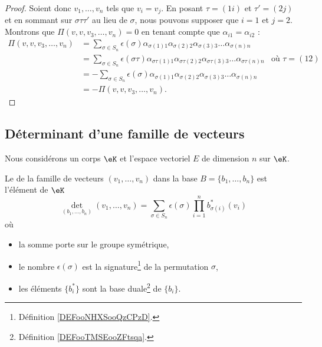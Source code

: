 \begin{proof}
	Soient donc \( v_1,\ldots, v_n\) tels que \( v_i=v_j\). En posant \( \tau=(1i)\) et \( \tau'=(2j)\) et en sommant sur \( \sigma\tau\tau'\) au lieu de \( \sigma\), nous pouvons supposer que \( i=1\) et \( j=2\). Montrons que \( \Pi(v,v,v_3,\ldots, v_n)=0\) en tenant compte que \( \alpha_{i1}=\alpha_{i2}\) :
	\begin{subequations}
		\begin{align}
			\Pi(v,v,v_3,\ldots, v_n) & =\sum_{\sigma\in S_n}\epsilon(\sigma)\alpha_{\sigma(1)1}\alpha_{\sigma(2)2}\alpha_{\sigma(3)3}\ldots \alpha_{\sigma(n)n}                                            \\
			                         & =\sum_{\sigma\in S_n}\epsilon(\sigma\tau)\alpha_{\sigma\tau(1)1}\alpha_{\sigma\tau(2)2}\alpha_{\sigma\tau(3)3}\ldots \alpha_{\sigma\tau(n)n} & \text{où } \tau=(12) \\
			                         & =-\sum_{\sigma\in S_n}\epsilon(\sigma)\alpha_{\sigma(1)1}\alpha_{\sigma(2)2}\alpha_{\sigma(3)3}\ldots \alpha_{\sigma(n)n}                                           \\
			                         & =-\Pi(v,v,v_3,\ldots, v_n).
		\end{align}
	\end{subequations}
\end{proof}

\subsection{Déterminant d'une famille de vecteurs}

Nous considérons un corps \( \eK\) et l'espace vectoriel \( E\) de dimension \( n\) sur \( \eK\).

\begin{definition}\label{DEFooODDFooSNahPb}
	Le  de la famille de vecteurs \( (v_1,\ldots, v_n)\) dans la base \( B=\{ b_1,\ldots, b_n \}\) est l'élément de \( \eK\)
	\begin{equation}        \label{EQooOJEXooXUpwfZ}
		\det_{(b_1,\ldots, b_n)}(v_1,\ldots, v_n)=\sum_{\sigma\in S_n}\epsilon(\sigma)\prod_{i=1}^nb^*_{\sigma(i)}(v_i)
	\end{equation}
	où
	\begin{itemize}
		\item
		      la somme porte sur le groupe symétrique,
		\item
		      le nombre \( \epsilon(\sigma)\) est la signature\footnote{Définition \ref{DEFooNHXSooQzCPzD}.} de la permutation \( \sigma\),
		\item
		      les éléments \( \{ b^*_i \}\) sont la base duale\footnote{Définition \ref{DEFooTMSEooZFtsqa}.} de \( \{ b_i \}\).
	\end{itemize}
\end{definition}

